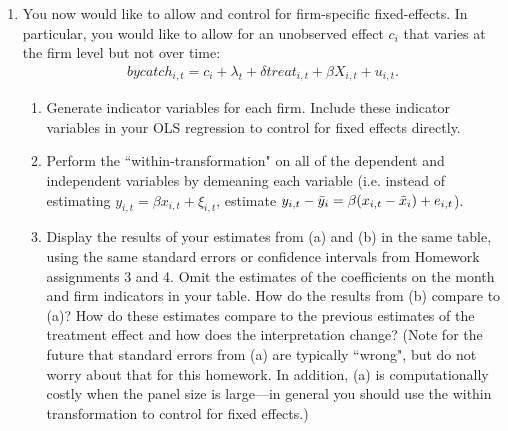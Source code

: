 \documentclass{article}
\begin{document}
\begin{enumerate}
    \item You now would like to allow and control for firm-specific fixed-effects.  In particular, you would like to allow for an unobserved effect $c_i$ that varies at the firm level but not over time:
    \begin{align}
        bycatch_{i,t} = c_i + \lambda_t + \delta treat_{i,t} + \beta X_{i,t} + u_{i,t}.
    \end{align}
    \begin{enumerate} [label=(\alph*)]
        \item Generate indicator variables for each firm.  Include these indicator variables in your OLS regression to control for fixed effects directly.  
        \item Perform the ``within-transformation" on all of the dependent and independent variables by demeaning each variable (i.e. instead of estimating $ y_{i,t} = \beta x_{i,t} + \xi_{i,t}$, estimate $y_{i,t} - \Bar{y}_i = \beta (x_{i,t} - \Bar{x}_i) + e_{i,t}$).
        \item Display the results of your estimates from (a) and (b) in the same table, using the same standard errors or confidence intervals from Homework assignments 3 and 4.  Omit the estimates of the coefficients on the month and firm indicators in your table.  How do the results from (b) compare to (a)?  How do these estimates compare to the previous estimates of the treatment effect and how does the interpretation change? (Note for the future that standard errors from (a) are typically ``wrong", but do not worry about that for this homework.  In addition, (a) is computationally costly when the panel size is large---in general you should use the within transformation to control for fixed effects.)
    \end{enumerate}
\end{enumerate}
\end{document}
